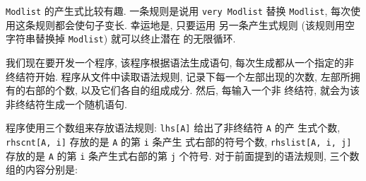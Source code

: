 \texttt{Modlist} 的产生式比较有趣. 一条规则是说用 \texttt{very Modlist}
替换 \texttt{Modlist}, 每次使用这条规则都会使句子变长. 幸运地是, 只要运用
另一条产生式规则 (该规则用空字符串替换掉 \texttt{Modlist}) 就可以终止潜在
的无限循环.

我们现在要开发一个程序, 该程序根据语法生成语句, 每次生成都从一个指定的非
终结符开始. 程序从文件中读取语法规则, 记录下每一个左部出现的次数, 
左部所拥有的右部的个数, 以及它们各自的组成成分. 然后, 每输入一个非
终结符, 就会为该非终结符生成一个随机语句.

程序使用三个数组来存放语法规则:
\texttt{lhs[A]} 给出了非终结符 \texttt{A} 的产 
生式个数, \texttt{rhscnt[A, i]} 存放的是 \texttt{A} 的第 \texttt{i} 条产生
式右部的符号个数, \texttt{rhslist[A, i, j]} 存放的是 \texttt{A} 的第 
\texttt{i} 条产生式右部的第 \texttt{j} 个符号. 对于前面提到的语法规则, 
三个数组的内容分别是:
